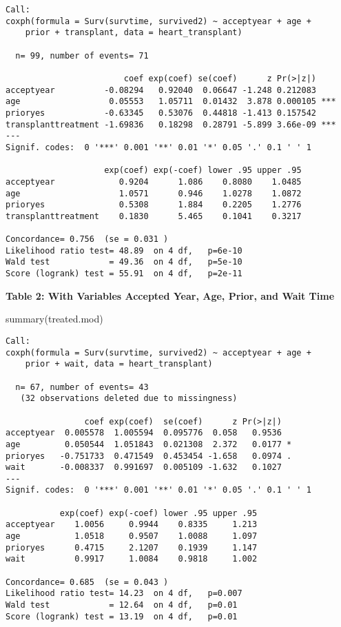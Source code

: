 \documentclass[
  letterpaper,
  DIV=11,
  numbers=noendperiod]{scrreprt}
\newenvironment{Shaded}{\begin{snugshade}}{\end{snugshade}}
\newcommand{\FunctionTok}[1]{\textcolor[rgb]{0.28,0.35,0.67}{#1}}
\newcommand{\NormalTok}[1]{\textcolor[rgb]{0.00,0.23,0.31}{#1}}
\begin{document}
\begin{verbatim}
Call:
coxph(formula = Surv(survtime, survived2) ~ acceptyear + age + 
    prior + transplant, data = heart_transplant)

  n= 99, number of events= 71 

                        coef exp(coef) se(coef)      z Pr(>|z|)    
acceptyear          -0.08294   0.92040  0.06647 -1.248 0.212083    
age                  0.05553   1.05711  0.01432  3.878 0.000105 ***
prioryes            -0.63345   0.53076  0.44818 -1.413 0.157542    
transplanttreatment -1.69836   0.18298  0.28791 -5.899 3.66e-09 ***
---
Signif. codes:  0 '***' 0.001 '**' 0.01 '*' 0.05 '.' 0.1 ' ' 1

                    exp(coef) exp(-coef) lower .95 upper .95
acceptyear             0.9204      1.086    0.8080    1.0485
age                    1.0571      0.946    1.0278    1.0872
prioryes               0.5308      1.884    0.2205    1.2776
transplanttreatment    0.1830      5.465    0.1041    0.3217

Concordance= 0.756  (se = 0.031 )
Likelihood ratio test= 48.89  on 4 df,   p=6e-10
Wald test            = 49.36  on 4 df,   p=5e-10
Score (logrank) test = 55.91  on 4 df,   p=2e-11
\end{verbatim}

\textbf{Table 2: With Variables Accepted Year, Age, Prior, and Wait Time}

\begin{Shaded}
\begin{Highlighting}[]
\FunctionTok{summary}\NormalTok{(treated.mod)}
\end{Highlighting}
\end{Shaded}

\begin{verbatim}
Call:
coxph(formula = Surv(survtime, survived2) ~ acceptyear + age + 
    prior + wait, data = heart_transplant)

  n= 67, number of events= 43 
   (32 observations deleted due to missingness)

                coef exp(coef)  se(coef)      z Pr(>|z|)  
acceptyear  0.005578  1.005594  0.095776  0.058   0.9536  
age         0.050544  1.051843  0.021308  2.372   0.0177 *
prioryes   -0.751733  0.471549  0.453454 -1.658   0.0974 .
wait       -0.008337  0.991697  0.005109 -1.632   0.1027  
---
Signif. codes:  0 '***' 0.001 '**' 0.01 '*' 0.05 '.' 0.1 ' ' 1

           exp(coef) exp(-coef) lower .95 upper .95
acceptyear    1.0056     0.9944    0.8335     1.213
age           1.0518     0.9507    1.0088     1.097
prioryes      0.4715     2.1207    0.1939     1.147
wait          0.9917     1.0084    0.9818     1.002

Concordance= 0.685  (se = 0.043 )
Likelihood ratio test= 14.23  on 4 df,   p=0.007
Wald test            = 12.64  on 4 df,   p=0.01
Score (logrank) test = 13.19  on 4 df,   p=0.01
\end{verbatim}
\end{document}
